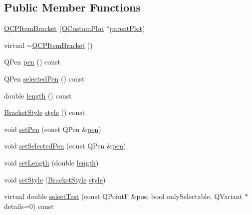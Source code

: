 \subsection*{Public Member Functions}
\begin{DoxyCompactItemize}
\item 
\hyperlink{class_q_c_p_item_bracket_a44ecfa37a76de5e3549e2d61f9d8ee56}{Q\+C\+P\+Item\+Bracket} (\hyperlink{class_q_custom_plot}{Q\+Custom\+Plot} $\ast$\hyperlink{class_q_c_p_layerable_ab7e0e94461566093d36ffc0f5312b109}{parent\+Plot})
\item 
virtual \hyperlink{class_q_c_p_item_bracket_ad773c3e8e09868d6f8caeb92c54919f4}{$\sim$\+Q\+C\+P\+Item\+Bracket} ()
\item 
Q\+Pen \hyperlink{class_q_c_p_item_bracket_a8963ff4a232b649c83d2461fd3c30d39}{pen} () const 
\item 
Q\+Pen \hyperlink{class_q_c_p_item_bracket_a9f6ea5ea9559ef36dfacdadd6e9bdcf0}{selected\+Pen} () const 
\item 
double \hyperlink{class_q_c_p_item_bracket_aed5126eafcb1381ee5718499c20ba023}{length} () const 
\item 
\hyperlink{class_q_c_p_item_bracket_a7ac3afd0b24a607054e7212047d59dbd}{Bracket\+Style} \hyperlink{class_q_c_p_item_bracket_afad726f453f70fe77c0e9c2f260fff97}{style} () const 
\item 
void \hyperlink{class_q_c_p_item_bracket_ab13001d9cc5d8f9e56ea15bdda682acb}{set\+Pen} (const Q\+Pen \&\hyperlink{class_q_c_p_item_bracket_a8963ff4a232b649c83d2461fd3c30d39}{pen})
\item 
void \hyperlink{class_q_c_p_item_bracket_a349785c31122778a520c64891fa204c5}{set\+Selected\+Pen} (const Q\+Pen \&\hyperlink{class_q_c_p_item_bracket_a8963ff4a232b649c83d2461fd3c30d39}{pen})
\item 
void \hyperlink{class_q_c_p_item_bracket_ac7cfc3da7da9b5c5ac5dfbe4f0351b2a}{set\+Length} (double \hyperlink{class_q_c_p_item_bracket_aed5126eafcb1381ee5718499c20ba023}{length})
\item 
void \hyperlink{class_q_c_p_item_bracket_a612dffa2373422eef8754d690add3703}{set\+Style} (\hyperlink{class_q_c_p_item_bracket_a7ac3afd0b24a607054e7212047d59dbd}{Bracket\+Style} \hyperlink{class_q_c_p_item_bracket_afad726f453f70fe77c0e9c2f260fff97}{style})
\item 
virtual double \hyperlink{class_q_c_p_item_bracket_aa6933caff1d42c54bcebc769ef88c798}{select\+Test} (const Q\+Point\+F \&pos, bool only\+Selectable, Q\+Variant $\ast$details=0) const 
\end{DoxyCompactItemize}
